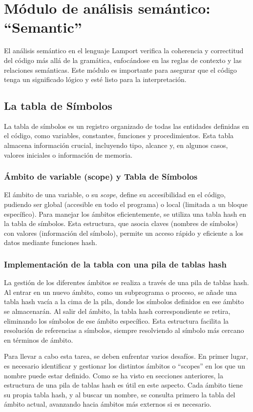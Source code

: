 \section{Módulo de análisis semántico: ``Semantic''}\label{sec:implementacionSemantic}
El análisis semántico en el lenguaje Lamport verifica la coherencia y correctitud del código más allá de la gramática, enfocándose en las reglas de contexto y las relaciones semánticas. Este módulo es importante para asegurar que el código tenga un significado lógico y esté listo para la interpretación.

\subsection{La tabla de Símbolos}
La tabla de símbolos es un registro organizado de todas las entidades definidas en el código, como variables, constantes, funciones y procedimientos. Esta tabla almacena información crucial, incluyendo tipo, alcance y, en algunos casos, valores iniciales o información de memoria.

\subsubsection{Ámbito de variable (scope) y Tabla de Símbolos}
El ámbito de una variable, o su \textit{scope}, define su accesibilidad en el código, pudiendo ser global (accesible en todo el programa) o local (limitada a un bloque específico). Para manejar los ámbitos eficientemente, se utiliza una tabla hash en la tabla de símbolos. Esta estructura, que asocia claves (nombres de símbolos) con valores (información del símbolo), permite un acceso rápido y eficiente a los datos mediante funciones hash.

\subsubsection{Implementación de la tabla con una pila de tablas hash}
La gestión de los diferentes ámbitos se realiza a través de una pila de tablas hash. Al entrar en un nuevo ámbito, como un subprograma o proceso, se añade una tabla hash vacía a la cima de la pila, donde los símbolos definidos en ese ámbito se almacenarán. Al salir del ámbito, la tabla hash correspondiente se retira, eliminando los símbolos de ese ámbito específico. Esta estructura facilita la resolución de referencias a símbolos, siempre resolviendo al símbolo más cercano en términos de ámbito.

Para llevar a cabo esta tarea, se deben enfrentar varios desafíos. En primer lugar, es necesario identificar y gestionar los distintos ámbitos o ``scopes'' en los que un nombre puede estar definido. Como se ha visto en secciones anteriores, la estructura de una pila de tablas hash es útil en este aspecto. Cada ámbito tiene su propia tabla hash, y al buscar un nombre, se consulta primero la tabla del ámbito actual, avanzando hacia ámbitos más externos si es necesario.

